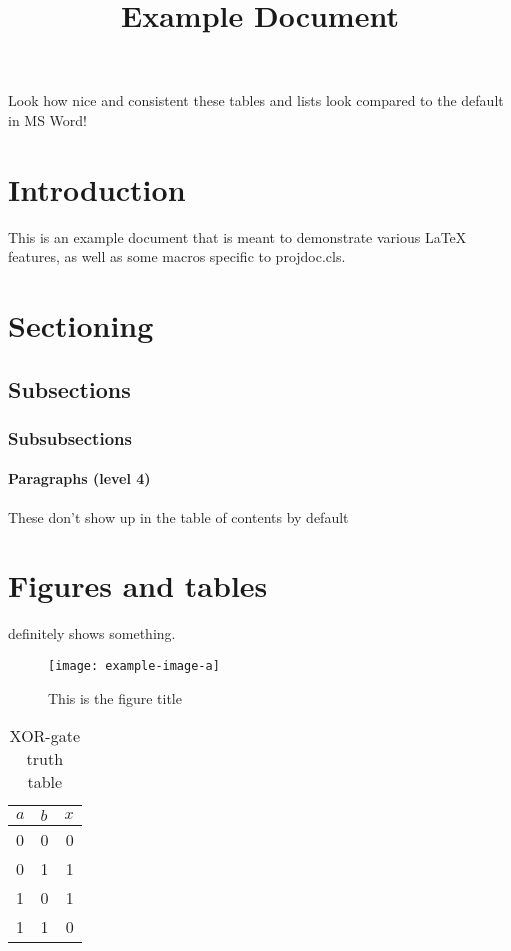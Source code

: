 \documentclass{projdoc}
\title{Example Document}
\begin{document}
\tablestables

\bigskip
Look how nice and consistent these tables and lists look compared to the default in
MS Word!

\newpage

\section{Introduction}

This is an example document that is meant to demonstrate various \LaTeX{} features,
as well as some macros specific to \hbox{projdoc.cls}.

\section{Sectioning}
\subsection{Subsections}
\subsubsection{Subsubsections}
\paragraph{Paragraphs (level 4)}

These don't show up in the table of contents by default

\section{Figures and tables}

 definitely shows something.

\begin{figure}
	\centering
	\texttt{[image: example-image-a]}
	\label{fig:example-a}
	\caption{This is the figure title}
\end{figure}

\begin{table}
	\centering
	\begin{tabular}{ll@{\qquad}r}
		\toprule
		$a$ & $b$ & $x$\\
		\midrule
		0 & 0 & 0\\
		0 & 1 & 1\\
		1 & 0 & 1\\
		1 & 1 & 0\\
		\bottomrule
	\end{tabular}
	\label{tab:gate-xor}
	\caption{XOR-gate truth table}
\end{table}
\end{document}

